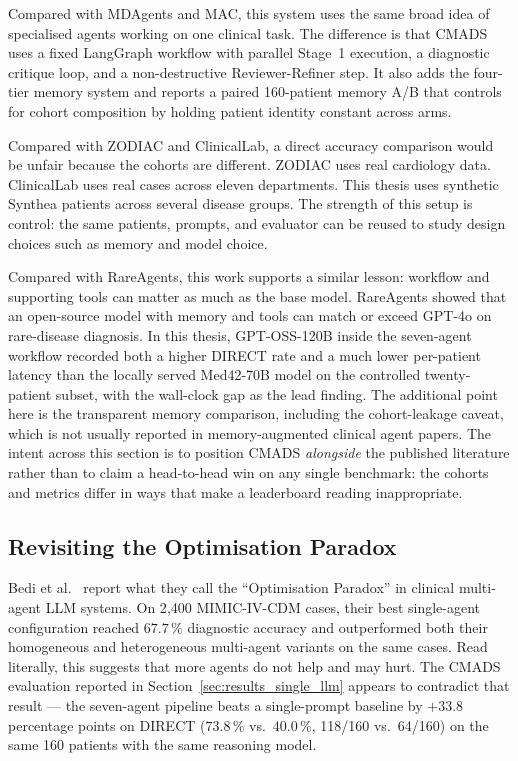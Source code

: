 Compared with MDAgents and MAC, this system uses the same broad idea of
specialised agents working on one clinical task. The difference is that CMADS
uses a fixed LangGraph workflow with parallel Stage~1 execution, a diagnostic
critique loop, and a non-destructive Reviewer-Refiner step. It also adds the
four-tier memory system and reports a paired 160-patient memory A/B that
controls for cohort composition by holding patient identity constant across
arms.

Compared with ZODIAC and ClinicalLab, a direct accuracy comparison would be
unfair because the cohorts are different. ZODIAC uses real cardiology data.
ClinicalLab uses real cases across eleven departments. This thesis uses
synthetic Synthea patients across several disease groups. The strength of this
setup is control: the same patients, prompts, and evaluator can be reused to
study design choices such as memory and model choice.

Compared with RareAgents, this work supports a similar lesson: workflow and
supporting tools can matter as much as the base model. RareAgents showed that
an open-source model with memory and tools can match or exceed GPT-4o on
rare-disease diagnosis. In this thesis, GPT-OSS-120B inside the seven-agent
workflow recorded both a higher DIRECT rate and a much lower per-patient
latency than the locally served Med42-70B model on the controlled twenty-patient
subset, with the wall-clock gap as the lead finding. The additional point
here is the transparent memory comparison, including the cohort-leakage
caveat, which is not usually reported in memory-augmented clinical agent
papers. The intent across this section is to position CMADS \emph{alongside}
the published literature rather than to claim a head-to-head win on any
single benchmark: the cohorts and metrics differ in ways that make a
leaderboard reading inappropriate.

\subsection{Revisiting the Optimisation Paradox}
\label{sec:results_paradox}

Bedi et al.~\cite{Bedi2025OptParadox} report what they call the
``Optimisation Paradox'' in clinical multi-agent LLM systems. On
2{,}400 MIMIC-IV-CDM cases, their best single-agent configuration
reached $67.7\,\%$ diagnostic accuracy and outperformed both their
homogeneous and heterogeneous multi-agent variants on the same
cases. Read literally, this suggests that more agents do not help
and may hurt. The CMADS evaluation reported in
Section~\ref{sec:results_single_llm} appears to contradict that
result --- the seven-agent pipeline beats a single-prompt baseline
by $+33.8$ percentage points on DIRECT ($73.8\,\%$ vs.\ $40.0\,\%$,
118/160 vs.\ 64/160) on the same 160 patients with the same
reasoning model.

